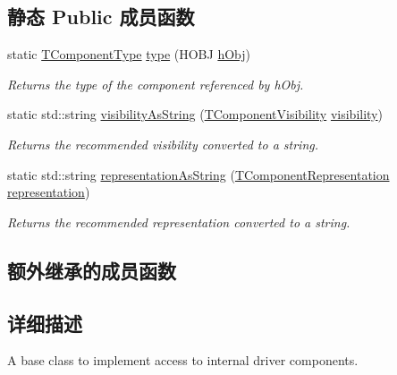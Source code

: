 \subsection*{静态 Public 成员函数}
\begin{DoxyCompactItemize}
\item 
static \hyperlink{group___common_interface_ga7dbe9709a3bdae0b29581ff4f6fca3ff}{T\+Component\+Type} \hyperlink{classmv_i_m_p_a_c_t_1_1acquire_1_1_component_adfb37f760b51b804473d180a83ef0fb6}{type} (H\+O\+B\+J \hyperlink{classmv_i_m_p_a_c_t_1_1acquire_1_1_component_access_a071d08bf770f55552998b86580e979de}{h\+Obj})
\begin{DoxyCompactList}\small\item\em Returns the type of the component referenced by {\itshape h\+Obj}. \end{DoxyCompactList}\item 
static std\+::string \hyperlink{classmv_i_m_p_a_c_t_1_1acquire_1_1_component_ab01e229848b62fccd552230fdc3124be}{visibility\+As\+String} (\hyperlink{group___common_interface_ga75b333e3ba771df98bde9ee1e12f57a0}{T\+Component\+Visibility} \hyperlink{classmv_i_m_p_a_c_t_1_1acquire_1_1_component_a986c68167207123176b6ffe03f974cf3}{visibility})
\begin{DoxyCompactList}\small\item\em Returns the recommended visibility converted to a string. \end{DoxyCompactList}\item 
static std\+::string \hyperlink{classmv_i_m_p_a_c_t_1_1acquire_1_1_component_a7a9991665fc79069ec04644735832959}{representation\+As\+String} (\hyperlink{group___common_interface_ga1e2d7ac6b3bb3ff1fe4bb53c4aa808ea}{T\+Component\+Representation} \hyperlink{classmv_i_m_p_a_c_t_1_1acquire_1_1_component_a877be25f91d98b261ace18060126c0e6}{representation})
\begin{DoxyCompactList}\small\item\em Returns the recommended representation converted to a string. \end{DoxyCompactList}\end{DoxyCompactItemize}
\subsection*{额外继承的成员函数}


\subsection{详细描述}
A base class to implement access to internal driver components. 

